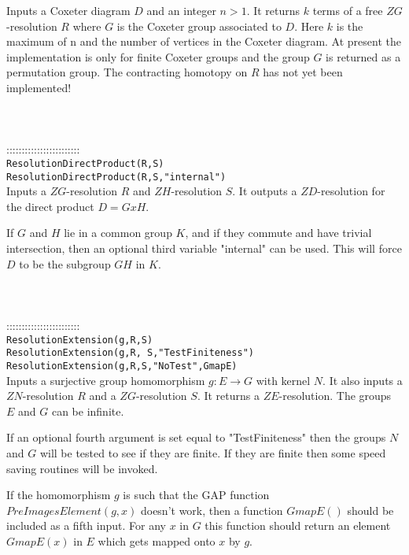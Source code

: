\documentclass[a4paper,11pt]{report}
\begin{document}
{ Inputs a Coxeter diagram $D$ and an integer $n>1$. It returns $k$ terms of a free $ZG$-resolution $R$ where $G$ is the Coxeter group associated to $D$. Here $k$ is the maximum of n and the number of vertices in the Coxeter diagram. At
present the implementation is only for finite Coxeter groups and the group $G$ is returned as a permutation group. The contracting homotopy on $R$ has not yet been implemented! \\
 \\
 \\
 \\
 ::::::::::::::::::::::::\\
 \texttt{ResolutionDirectProduct(R,S) }\\
 \texttt{ResolutionDirectProduct(R,S,"internal")}\\
 

 Inputs a $ZG$-resolution $R$ and $ZH$-resolution $S$. It outputs a $ZD$-resolution for the direct product $D=G x H$.

 If $G$ and $H$ lie in a common group $K$, and if they commute and have trivial intersection, then an optional third
variable "internal" can be used. This will force $D$ to be the subgroup $GH$ in $K$. \\
 \\
 \\
 \\
 ::::::::::::::::::::::::\\
 \texttt{ResolutionExtension(g,R,S) }\\
 \texttt{ResolutionExtension(g,R, S,"TestFiniteness")}\\
 \texttt{ResolutionExtension(g,R,S,"NoTest",GmapE)}\\
 

 Inputs a surjective group homomorphism $g:E \longrightarrow G$ with kernel $N$. It also inputs a $ZN$-resolution $R$ and a $ZG$-resolution $S$. It returns a $ZE$-resolution. The groups $E$ and $G$ can be infinite.

 If an optional fourth argument is set equal to "TestFiniteness" then the
groups $N$ and $G$ will be tested to see if they are finite. If they are finite then some speed
saving routines will be invoked.

 If the homomorphism $g$ is such that the GAP function $PreImagesElement(g,x)$ doesn't work, then a function $GmapE()$ should be included as a fifth input. For any $x$ in $G$ this function should return an element $GmapE(x)$ in $E$ which gets mapped onto $x$ by $g$.

}
\end{document}
